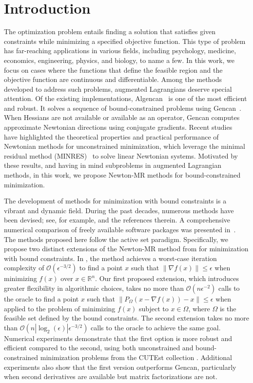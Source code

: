 \documentclass[11pt]{article}
\begin{document}
\section{Introduction} \label{sec1}

The optimization problem entails finding a solution that satisfies given constraints while minimizing a specified objective function. This type of problem has far-reaching applications in various fields, including psychology, medicine, economics, engineering, physics, and biology, to name a few. In this work, we focus on cases where the functions that define the feasible region and the objective function are continuous and differentiable. Among the methods developed to address such problems, augmented Lagrangians deserve special attention. Of the existing implementations, Algencan~\cite{abmstango,bmbook,bmcomper} is one of the most efficient and robust. It solves a sequence of bound-constrained problems using Gencan~\cite{bmgencan}. When Hessians are not available or available as an operator, Gencan computes approximate Newtonian directions using conjugate gradients. Recent studies~\cite{Orban2019,Liu2021,Liu2022,Liu2023} have highlighted the theoretical properties and practical performance of Newtonian methods for unconstrained minimization, which leverage the minimal residual method (MINRES)~\cite{Paige1975} to solve linear Newtonian systems. Motivated by these results, and having in mind subproblems in augmented Lagrangian methods, in this work, we propose Newton-MR methods for bound-constrained minimization.

The development of methods for minimization with bound constraints is a vibrant and dynamic field. During the past decades, numerous methods have been devised; see, for example, \cite{abmbetra,bmgencan,Facchinei2002,asacg,Heinkenschloss1999,Lin1999,lbfgsb3} and the references therein. A comprehensive numerical comparison of freely available software packages was presented in~\cite{bg}. The methods proposed here follow the active set paradigm. Specifically, we propose two distinct extensions of the Newton-MR method from \cite{Liu2023} for minimization with bound constraints. In \cite{Liu2023}, the method achieves a worst-case iteration complexity of $\mathcal{O}(\epsilon^{-3/2})$ to find a point $x$ such that $\|\nabla f(x) \| \leq \epsilon$ when minimizing $f(x)$ over $x \in \mathbb{R}^n$. Our first proposed extension, which introduces greater flexibility in algorithmic choices, takes no more than $\mathcal{O}(n\epsilon^{-2})$ calls to the oracle to find a point $x$ such that $\| P_\Omega( x - \nabla f(x) ) - x \| \leq \epsilon$ when applied to the problem of minimizing $f(x)$ subject to $x \in \Omega$, where $\Omega$ is the feasible set defined by the bound constraints. The second extension takes no more than $\mathcal{O}(n|\log_{2}(\epsilon)|\epsilon^{-3/2})$ calls to the oracle to achieve the same goal. Numerical experiments demonstrate that the first option is more robust and efficient compared to the second, using both unconstrained and bound-constrained minimization problems from the CUTEst collection \cite{cutest}. Additional experiments also show that the first version outperforms Gencan, particularly when second derivatives are available but matrix factorizations are not.
\end{document}
